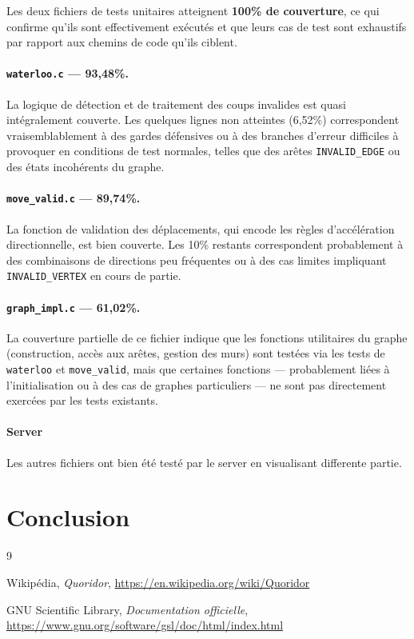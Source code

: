 \documentclass[12pt,a4paper]{article}
\begin{document}
Les deux fichiers de tests unitaires atteignent \textbf{100\% de couverture}, 
ce qui confirme qu'ils sont effectivement exécutés et que leurs cas de test 
sont exhaustifs par rapport aux chemins de code qu'ils ciblent.

\paragraph{\texttt{waterloo.c} --- 93,48\%.}
La logique de détection et de traitement des coups invalides est quasi 
intégralement couverte. Les quelques lignes non atteintes (6,52\%) 
correspondent vraisemblablement à des gardes défensives ou à des branches 
d'erreur difficiles à provoquer en conditions de test normales, telles que 
des arêtes \texttt{INVALID\_EDGE} ou des états incohérents du graphe.

\paragraph{\texttt{move\_valid.c} --- 89,74\%.}
La fonction de validation des déplacements, qui encode les règles 
d'accélération directionnelle, est bien couverte. Les 10\% restants 
correspondent probablement à des combinaisons de directions peu fréquentes 
ou à des cas limites impliquant \texttt{INVALID\_VERTEX} en cours de partie.

\paragraph{\texttt{graph\_impl.c} --- 61,02\%.}
La couverture partielle de ce fichier indique que les fonctions utilitaires 
du graphe (construction, accès aux arêtes, gestion des murs) sont testées 
via les tests de \texttt{waterloo} et \texttt{move\_valid}, mais que certaines 
fonctions --- probablement liées à l'initialisation ou à des cas de graphes 
particuliers --- ne sont pas directement exercées par les tests existants.

\paragraph{Server}
Les autres fichiers ont bien été testé par le server en visualisant differente partie.



\section{Conclusion}
\label{sec:conclusion}



\begin{thebibliography}{9}

  Wikipédia,
  \textit{Quoridor},
  \url{https://en.wikipedia.org/wiki/Quoridor}

  GNU Scientific Library,
  \textit{Documentation officielle},
  \url{https://www.gnu.org/software/gsl/doc/html/index.html}

\end{thebibliography}
\end{document}
